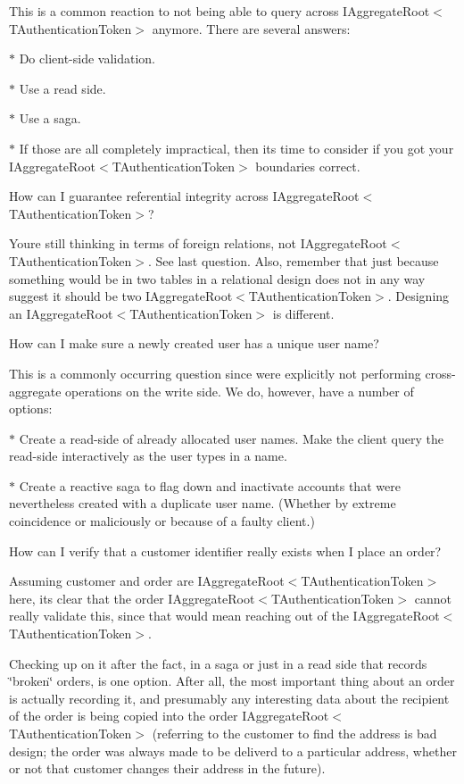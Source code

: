 This is a common reaction to not being able to query across I\+Aggregate\+Root$<$\+T\+Authentication\+Token$>$ anymore. There are several answers\+: 

$\ast$ Do client-\/side validation. 

$\ast$ Use a read side. 

$\ast$ Use a saga. 

$\ast$ If those are all completely impractical, then it\textquotesingle{}s time to consider if you got your I\+Aggregate\+Root$<$\+T\+Authentication\+Token$>$ boundaries correct. 

How can I guarantee referential integrity across I\+Aggregate\+Root$<$\+T\+Authentication\+Token$>$? 

You\textquotesingle{}re still thinking in terms of foreign relations, not I\+Aggregate\+Root$<$\+T\+Authentication\+Token$>$. See last question. Also, remember that just because something would be in two tables in a relational design does not in any way suggest it should be two I\+Aggregate\+Root$<$\+T\+Authentication\+Token$>$. Designing an I\+Aggregate\+Root$<$\+T\+Authentication\+Token$>$ is different. 

How can I make sure a newly created user has a unique user name? 

This is a commonly occurring question since we\textquotesingle{}re explicitly not performing cross-\/aggregate operations on the write side. We do, however, have a number of options\+: 

$\ast$ Create a read-\/side of already allocated user names. Make the client query the read-\/side interactively as the user types in a name. 

$\ast$ Create a reactive saga to flag down and inactivate accounts that were nevertheless created with a duplicate user name. (Whether by extreme coincidence or maliciously or because of a faulty client.) 

How can I verify that a customer identifier really exists when I place an order? 

Assuming customer and order are I\+Aggregate\+Root$<$\+T\+Authentication\+Token$>$ here, it\textquotesingle{}s clear that the order I\+Aggregate\+Root$<$\+T\+Authentication\+Token$>$ cannot really validate this, since that would mean reaching out of the I\+Aggregate\+Root$<$\+T\+Authentication\+Token$>$. 

Checking up on it after the fact, in a saga or just in a read side that records \char`\"{}broken\char`\"{} orders, is one option. After all, the most important thing about an order is actually recording it, and presumably any interesting data about the recipient of the order is being copied into the order I\+Aggregate\+Root$<$\+T\+Authentication\+Token$>$ (referring to the customer to find the address is bad design; the order was always made to be deliverd to a particular address, whether or not that customer changes their address in the future). 

